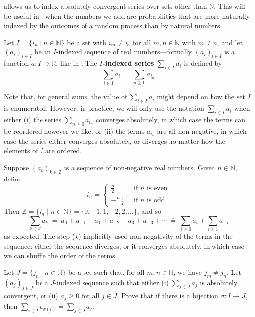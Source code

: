  allows us to index absolutely convergent series over sets other than $\mathbb{N}$. This will be useful in , when the numbers we add are probabilities that are more naturally indexed by the outcomes of a random process than by natural numbers.

\begin{definition}
\label{defSumOverCountablyInfiniteSet}
Let $I = \{ i_n \mid n \in \mathbb{N} \}$ be a set with $i_m \ne i_n$ for all $m,n \in \mathbb{N}$ with $m \ne n$, and let $(a_i)_{i \in I}$ be an $I$-indexed sequence of real numbers---formally $(a_i)_{i \in I}$ is a function $a : I \to \mathbb{R}$, like in . The \textbf{$I$-indexed series} $\displaystyle \sum_{i \in I} a_i$ is defined by
\[ \sum_{i \in I} a_i ~=~ \sum_{n \ge 0} a_{i_n} \]
\end{definition}

Note that, for general sums, the value of $\sum_{i \in I} a_i$ might depend on how the set $I$ is enumerated. However, in practice, we will only use the notation $\sum_{i \in I} a_i$ when either (i) the series $\sum_{n \ge 0} a_{i_n}$ converges absolutely, in which case the terms can be reordered however we like; or (ii) the terms $a_{i_n}$ are all non-negative, in which case the series either converges absolutely, or diverges no matter how the elements of $I$ are ordered.

\begin{example}
Suppose $(a_k)_{k \in \mathbb{Z}}$ is a sequence of non-negative real numbers. Given $n \in \mathbb{N}$, define
\[ i_n = \begin{cases} \frac{n}{2} & \text{if $n$ is even} \\ -\frac{n+1}{2} & \text{if $n$ is odd} \end{cases} \]
Then $\mathbb{Z} = \{ i_n \mid n \in \mathbb{N} \} = \{ 0,{-1},1,{-2},2,\dots{} \}$, and so
\[ \sum_{k \in \mathbb{Z}} a_k ~=~ a_0 + a_{-1} + a_1 + a_{-2} + a_3 + a_{-3} + \cdots ~\overset{\star}{=}~ \sum_{i \ge 0} a_i + \sum_{i \ge 1} a_{-i} \]
as expected. The step ($\star$) implicitly used non-negativity of the terms in the sequence: either the sequence diverges, or it converges absolutely, in which case we can shuffle the order of the terms.
\end{example}

\begin{exercise}
Let $J = \{ j_n \mid n \in \mathbb{N} \}$ be a set such that, for all $m,n \in \mathbb{N}$, we have $j_m \ne j_n$. Let $(a_j)_{j \in J}$ be a $J$-indexed sequence such that either (i) $\sum_{j \in J} a_j$ is absolutely convergent, or (ii) $a_j \ge 0$ for all $j \in J$. Prove that if there is a bijection $\sigma : I \to J$, then $\sum_{i \in I} a_{\sigma(i)} = \sum_{j \in J} a_j$.
\end{exercise}

